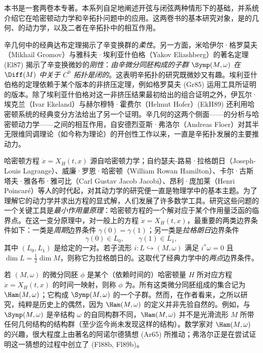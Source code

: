 
本书是一套两卷本专著。本系列自足地阐述开弦与闭弦两种情形下的基础\termFloerHomology{}，并系统介绍它在哈密顿动力学和辛拓扑问题中的应用。这两卷书的基本研究对象，是\termLagrangianSubmanifold{}的几何、\termHamiltonianDiffeomorphism{}的动力学，以及二者在辛拓扑中的相互作用。

辛几何中的经典达布定理揭示了辛变换群的\emph{柔性}。另一方面，米哈伊尔·格罗莫夫（Mikhail Gromov）与雅科夫·埃利亚什伯格（Yakov Eliashberg）的著名定理 (El87) 揭示了辛变换微妙的\emph{刚性}：\emph{由辛微分同胚构成的子群 $\Symp(M,\omega)$ 在 $\Diff(M)$ 中关于 $C^0$ 拓扑是闭的}。这表明辛拓扑的研究既微妙又有趣。埃利亚什伯格的定理依赖于某个版本的非挤压定理，例如格罗莫夫 (Gr85) 运用\termPseudoholomorphicCurve{}工具所证明的版本。除了埃利亚什伯格对这一非挤压结果最初给出的组合证明之外，伊瓦尔·埃克兰（Ivar Ekeland）与赫尔穆特·霍费尔（Helmut Hofer）(EkH89) 还利用哈密顿系统的经典变分方法给出了另一个证明。辛几何的这两个侧面——\termPseudoholomorphicCurve{}的分析与哈密顿动力学——之间的相互作用，自安德烈亚斯·弗洛尔（Andreas Floer）对其半无限维同调理论（如今称为\emph{\termFloerHomology{}}理论）的开创性工作以来，一直是辛拓扑发展的主要推动力。

哈密顿方程 $\dot{x}=X_H(t,x)$ 源自哈密顿力学；自约瑟夫-路易·拉格朗日（Joseph-Louis Lagrange）、威廉·罗恩·哈密顿（William Rowan Hamilton）、卡尔·古斯塔夫·雅各布·雅可比（Carl Gustav Jacob Jacobi）、昂利·庞加莱（Henri Poincaré）等人的时代起，对其动力学的研究便一直是物理学中的基本主题。为了理解它的动力学并求出方程的显式解，人们发展了许多数学工具。研究这些问题的一个关键工具是\emph{最小作用量原理}：哈密顿方程的一个解对应于某个作用量泛函的临界点。在这一变分原理中，对一般\termSymplecticManifold{}上的方程 $\dot{x}=X_H(t,x)$，最重要的两类边界条件如下：一类是\emph{周期}边界条件 $\gamma(0)=\gamma(1)$；另一类是\emph{拉格朗日}边界条件
\[
  \gamma(0)\in L_0,\qquad \gamma(1)\in L_1,
\]
其中 $(L_0,L_1)$ 是给定的一对\termLagrangianSubmanifold{}。若子流形 $i:L\hookrightarrow(M,\omega)$ 满足 $i^*\omega=0$ 且 $\dim L=\frac12\dim M$，则称它为拉格朗日的。这取代了经典力学中的\emph{两点}边界条件。

若\termSymplecticManifold{} $(M,\omega)$ 的微分同胚 $\phi$ 是某个（依赖时间的）哈密顿量 $H$ 所对应方程 $\dot{x}=X_H(t,x)$ 的时间一映射，则称 $\phi$ 为\termHamiltonianDiffeomorphism{}。所有这类微分同胚组成的集合记为 $\Ham(M,\omega)$；它构成 $\Symp(M,\omega)$ 的一个子群。然而，在作者看来，之所以研究\termHamiltonianDiffeomorphism{}，纯粹是历史上的偶然，因为 $\Ham(M,\omega)$ 的定义并非先验自然的。例如，与 $\Symp(M,\omega)$ 是辛结构 $\omega$ 的自同构群不同，$\Ham(M,\omega)$ 并不是光滑流形 $M$ 所带任何几何结构的结构群（至少迄今尚未发现这样的结构）。数学家对 $\Ham(M,\omega)$ 的兴趣，很大程度上由著名的阿诺尔德猜想 (Ar65) 所推动；弗洛尔正是在尝试证明这一猜想的过程中创立了\termFloerHomology{} (Fl88b, Fl89b)。

